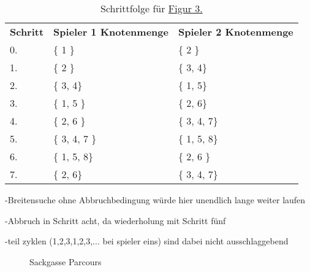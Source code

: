 \documentclass[a4paper,10pt,ngerman]{scrartcl}
\begin{document}
    \begin{table}[h!]
        \centering
        \begin{tabular}{lll}
            \textbf{Schritt} & \textbf{Spieler 1 Knotenmenge} & \textbf{Spieler 2 Knotenmenge} \\
            0.               & \{ 1 \}                        & \{ 2 \}                        \\
            1.               & \{ 2 \}                        & \{  3, 4\}                       \\
            2.               & \{ 3, 4\}                      & \{  1, 5\}                       \\
            3.               & \{ 1, 5 \}                     & \{  2, 6\}                       \\
            4.               & \{ 2, 6 \}                     & \{  3, 4, 7\}                    \\
            5.               & \{ 3, 4, 7 \}                  & \{  1, 5, 8\}                    \\
            6.               & \{  1, 5, 8\}                    & \{ 2, 6 \}                     \\
            7.               & \{  2, 6\}                       & \{  3, 4, 7\}                    \\
        \end{tabular}
        \caption{Schrittfolge für \hyperref[fig:Figure4]{Figur 3.}}
        \label{tab:Table3}
    \end{table}

    -Breitensuche ohne Abbruchbedingung würde hier unendlich lange weiter laufen

    -Abbruch in Schritt acht, da wiederholung mit Schritt fünf

    -teil zyklen (1,2,3,1,2,3,... bei spieler eins) sind dabei nicht ausschlaggebend




    \begin{figure}[h!]
        \centering
        \FigurFuenf{}
        \caption{Sackgasse Parcours}
        \label{fig:Figure5}
    \end{figure}
\end{document}
